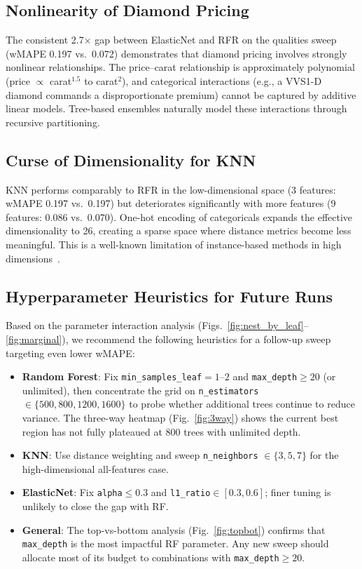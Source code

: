\documentclass[conference]{IEEEtran}
\begin{document}
\subsection{Nonlinearity of Diamond Pricing}

The consistent 2.7$\times$ gap between ElasticNet and RFR on the qualities sweep (wMAPE 0.197 vs.\ 0.072) demonstrates that diamond pricing involves strongly nonlinear relationships. The price--carat relationship is approximately polynomial (price $\propto$ carat$^{1.5}$ to carat$^2$), and categorical interactions (e.g., a VVS1-D diamond commands a disproportionate premium) cannot be captured by additive linear models. Tree-based ensembles naturally model these interactions through recursive partitioning.

\subsection{Curse of Dimensionality for KNN}

KNN performs comparably to RFR in the low-dimensional space (3 features: wMAPE 0.197 vs.\ 0.197) but deteriorates significantly with more features (9 features: 0.086 vs.\ 0.070). One-hot encoding of categoricals expands the effective dimensionality to 26, creating a sparse space where distance metrics become less meaningful. This is a well-known limitation of instance-based methods in high dimensions~\cite{b8}.

\subsection{Hyperparameter Heuristics for Future Runs}

Based on the parameter interaction analysis (Figs.~\ref{fig:nest_by_leaf}--\ref{fig:marginal}), we recommend the following heuristics for a follow-up sweep targeting even lower wMAPE:

\begin{itemize}
\item \textbf{Random Forest}: Fix \texttt{min\_samples\_leaf}$=1$--$2$ and \texttt{max\_depth}$\ge 20$ (or unlimited), then concentrate the grid on \texttt{n\_estimators}$\in \{500, 800, 1200, 1600\}$ to probe whether additional trees continue to reduce variance. The three-way heatmap (Fig.~\ref{fig:3way}) shows the current best region has not fully plateaued at 800 trees with unlimited depth.
\item \textbf{KNN}: Use distance weighting and sweep \texttt{n\_neighbors} $\in \{3, 5, 7\}$ for the high-dimensional all-features case.
\item \textbf{ElasticNet}: Fix \texttt{alpha}$\le 0.3$ and \texttt{l1\_ratio}$\in [0.3, 0.6]$; finer tuning is unlikely to close the gap with RF.
\item \textbf{General}: The top-vs-bottom analysis (Fig.~\ref{fig:topbot}) confirms that \texttt{max\_depth} is the most impactful RF parameter. Any new sweep should allocate most of its budget to combinations with \texttt{max\_depth}$\ge 20$.
\end{itemize}
\end{document}
